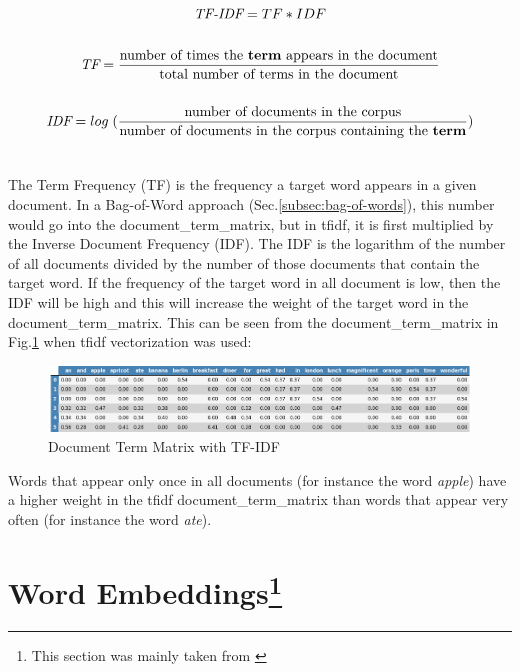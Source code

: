\begin{gather}\label{eq:tfidf}
    \emph{TF-IDF} = TF * IDF
\notag \\ \notag \\
    \emph{TF} = \frac {\textrm{number of times the \textbf{term} appears in the document} }{ \textrm{total number of terms in the document}}
\notag \\ \notag \\
    \emph{IDF} = log\; (\frac {\textrm{number of documents in the corpus}} {\textrm{number of documents in the corpus containing the \textbf{term}}})
\notag \\ \notag \\
\end{gather}

The Term Frequency (TF) is the frequency a target word appears in a given \gls{document}.
In a Bag-of-Word approach (Sec.\ref{subsec:bag-of-words}), this number would go into the \gls{document_term_matrix}, but
in \gls{tfidf}, it is first multiplied by the Inverse Document Frequency (IDF).
The IDF is the logarithm of the number of all \glspl{document} divided by the number of those \glspl{document}
that contain the target word.
If the frequency of the target word in all \gls{document} is low, then the IDF will be high and this will increase the weight of
the target word in the \gls{document_term_matrix}.
This can be seen from the \gls{document_term_matrix} in Fig.\ref{fig:document_term_matrix_tfidf} when \gls{tfidf} vectorization was used:

\begin{figure}[H]
    \centering
    \includegraphics[width=1.0\textwidth]{Assets/topic_model_tfidf_vector}
    \caption{Document Term Matrix with TF-IDF}
    \label{fig:document_term_matrix_tfidf}
\end{figure}

Words that appear only once in all \glspl{document} (for instance the word \emph{apple}) have a higher weight in the \gls{tfidf} \gls{document_term_matrix} than words
that appear very often (for instance the word \emph{ate}).

\section{Word Embeddings\protect\footnote{This section was mainly taken from \cite{LfdTalk15}}}\label{sec:word-embeddings}


